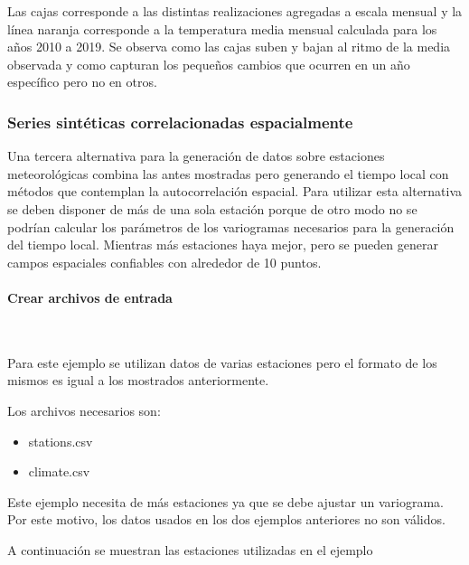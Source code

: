 \documentclass[
  12pt]{article}
\newenvironment{Shaded}{}{}
\newcommand{\CommentTok}[1]{\textcolor[rgb]{0.38,0.63,0.69}{\textit{#1}}}
\newcommand{\DataTypeTok}[1]{\textcolor[rgb]{0.56,0.13,0.00}{#1}}
\newcommand{\KeywordTok}[1]{\textcolor[rgb]{0.00,0.44,0.13}{\textbf{#1}}}
\newcommand{\NormalTok}[1]{#1}
\newcommand{\OperatorTok}[1]{\textcolor[rgb]{0.40,0.40,0.40}{#1}}
\newcommand{\StringTok}[1]{\textcolor[rgb]{0.25,0.44,0.63}{#1}}
\providecommand{\tightlist}{%
  \setlength{\itemsep}{0pt}\setlength{\parskip}{0pt}}
\begin{document}
Las cajas corresponde a las distintas realizaciones agregadas a escala mensual y la línea naranja corresponde a la temperatura media mensual calculada para los años 2010 a 2019. Se observa como las cajas suben y bajan al ritmo de la media observada y como capturan los pequeños cambios que ocurren en un año específico pero no en otros.

\hypertarget{series-sintuxe9ticas-correlacionadas-espacialmente}{%
\subsubsection{Series sintéticas correlacionadas espacialmente}\label{series-sintuxe9ticas-correlacionadas-espacialmente}}

Una tercera alternativa para la generación de datos sobre estaciones meteorológicas combina las antes mostradas pero generando el tiempo local con métodos que contemplan la autocorrelación espacial. Para utilizar esta alternativa se deben disponer de más de una sola estación porque de otro modo no se podrían calcular los parámetros de los variogramas necesarios para la generación del tiempo local. Mientras más estaciones haya mejor, pero se pueden generar campos espaciales confiables con alrededor de 10 puntos.

\hypertarget{crear-archivos-de-entrada}{%
\paragraph{Crear archivos de entrada}\label{crear-archivos-de-entrada}}

~

Para este ejemplo se utilizan datos de varias estaciones pero el formato de los mismos es igual a los mostrados anteriormente.

Los archivos necesarios son:

\begin{itemize}
\tightlist
\item
  stations.csv
\item
  climate.csv
\end{itemize}

Este ejemplo necesita de más estaciones ya que se debe ajustar un variograma. Por este motivo, los datos usados en los dos ejemplos anteriores no son válidos.

A continuación se muestran las estaciones utilizadas en el ejemplo

\begin{Shaded}
\end{Shaded}
\end{document}
